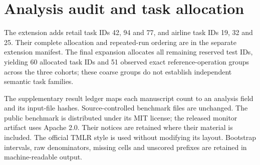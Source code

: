 \documentclass[10pt]{article}
\begin{document}
\section{Analysis audit and task allocation}

The extension adds retail task IDs 42, 94 and 77, and airline task IDs 19, 32 and 25. Their complete allocation and repeated-run ordering are in the separate extension manifest. The final expansion allocates all remaining reserved test IDs, yielding 60 allocated task IDs and 51 observed exact reference-operation groups across the three cohorts; these coarse groups do not establish independent semantic task families.

The supplementary result ledger maps each manuscript count to an analysis field and its input-file hashes. Source-controlled benchmark files are unchanged. The public benchmark is distributed under its MIT license; the released monitor artifact uses Apache 2.0. Their notices are retained where their material is included. The official TMLR style is used without modifying its layout. Bootstrap intervals, raw denominators, missing cells and unscored prefixes are retained in machine-readable output.

\end{document}
